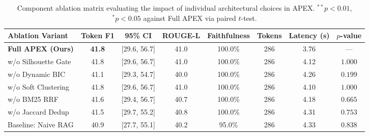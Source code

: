 \begin{table}[t]
\centering
\small
\begin{tabular}{l c c c c c c c}
\toprule
\textbf{Ablation Variant} & \textbf{Token F1} & \textbf{95\% CI} & \textbf{ROUGE-L} & \textbf{Faithfulness} & \textbf{Tokens} & \textbf{Latency (s)} & \textbf{$p$-value} \\
\midrule
\textbf{Full APEX (Ours)} & \textbf{41.8} & [29.6, 56.7] & 41.0 & 100.0\% & 286 & 3.76 & --- \\
w/o Silhouette Gate & 41.8 & [29.6, 56.7] & 41.0 & 100.0\% & 286 & 4.12 & $1.000$ \\
w/o Dynamic BIC & 41.1 & [29.3, 54.7] & 40.0 & 100.0\% & 286 & 4.26 & $0.199$ \\
w/o Soft Clustering & 41.8 & [29.6, 56.7] & 41.0 & 100.0\% & 286 & 4.10 & $1.000$ \\
w/o BM25 RRF & 41.6 & [29.4, 56.7] & 40.7 & 100.0\% & 286 & 4.18 & $0.665$ \\
w/o Jaccard Dedup & 41.5 & [29.7, 55.2] & 40.8 & 100.0\% & 286 & 4.31 & $0.753$ \\
Baseline: Naive RAG & 40.9 & [27.7, 55.1] & 40.2 & 95.0\% & 286 & 4.33 & $0.838$ \\
\bottomrule
\end{tabular}
\caption{Component ablation matrix evaluating the impact of individual architectural choices in APEX. $^{**}p < 0.01$, $^{*}p < 0.05$ against Full APEX via paired $t$-test.}
\label{tab:ablation_matrix}
\end{table}
